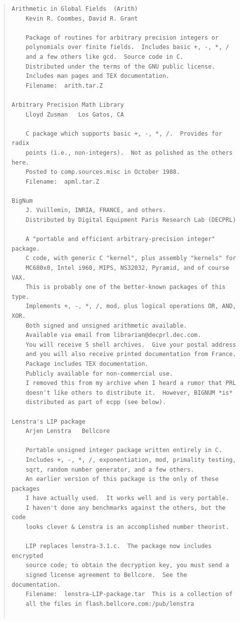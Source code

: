 \begin{quote}
\begin{scriptsize}
\begin{verbatim}
Arithmetic in Global Fields  (Arith)
    Kevin R. Coombes, David R. Grant
    
    Package of routines for arbitrary precision integers or
    polynomials over finite fields.  Includes basic +, -, *, /
    and a few others like gcd.  Source code in C.
    Distributed under the terms of the GNU public license.
    Includes man pages and TEX documentation.
    Filename:  arith.tar.Z

Arbitrary Precision Math Library
    Lloyd Zusman   Los Gatos, CA
    
    C package which supports basic +, -, *, /.  Provides for radix
    points (i.e., non-integers).  Not as polished as the others here.
    Posted to comp.sources.misc in October 1988.
    Filename:  apml.tar.Z
    
BigNum
    J. Vuillemin, INRIA, FRANCE, and others.
    Distributed by Digital Equipment Paris Research Lab (DECPRL)
    
    A "portable and efficient arbitrary-precision integer" package.
    C code, with generic C "kernel", plus assembly "kernels" for
    MC680x0, Intel i960, MIPS, NS32032, Pyramid, and of course VAX.
    This is probably one of the better-known packages of this type.
    Implements +, -, *, /, mod, plus logical operations OR, AND, XOR.
    Both signed and unsigned arithmetic available.
    Available via email from librarian@decprl.dec.com.
    You will receive 5 shell archives.  Give your postal address
    and you will also receive printed documentation from France.
    Package includes TEX documentation.
    Publicly available for non-commercial use.
    I removed this from my archive when I heard a rumor that PRL
    doesn't like others to distribute it.  However, BIGNUM *is*
    distributed as part of ecpp (see below).

Lenstra's LIP package
    Arjen Lenstra   Bellcore
    
    Portable unsigned integer package written entirely in C.
    Includes +, -, *, /, exponentiation, mod, primality testing,
    sqrt, random number generator, and a few others.  
    An earlier version of this package is the only of these packages
    I have actually used.  It works well and is very portable.  
    I haven't done any benchmarks against the others, but the code 
    looks clever & Lenstra is an accomplished number theorist.

    LIP replaces lenstra-3.1.c.  The package now includes encrypted
    source code; to obtain the decryption key, you must send a
    signed license agreement to Bellcore.  See the documentation.
    Filename:  lenstra-LIP-package.tar  This is a collection of
    all the files in flash.bellcore.com:/pub/lenstra


\end{verbatim}
\end{scriptsize}
\end{quote}

